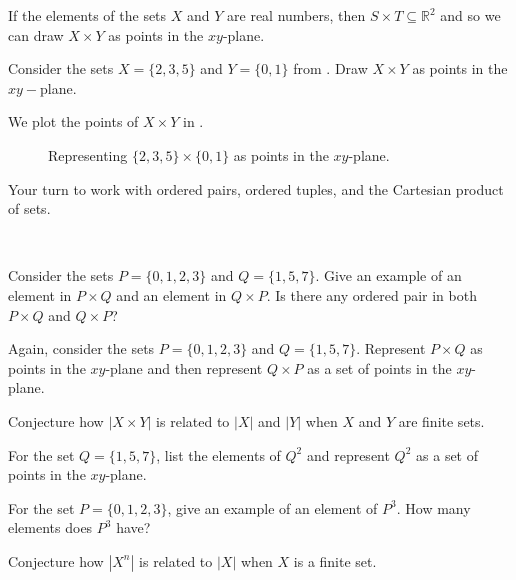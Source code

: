 If the elements of the sets $X$ and $Y$ are real numbers, then $S \times T \subseteq \mathbb{R}^2$ and so we can draw $X \times Y$ as points in the $xy$-plane.

\begin{exam}
    Consider the sets $X = \{2,3,5\}$ and $Y = \{0,1\}$ from .  Draw $X \times Y$ as points in the $xy-$plane.
        \begin{soln}
            We plot the points of $X \times Y$ in .

            \begin{figure}[hbtp]
                \centering
                
                \caption{Representing $\{2,3,5\} \times \{0,1\}$ as points in the $xy$-plane.}
                \label{fig_cart_prod_as_points}
            \end{figure}
        \end{soln}
\end{exam}

Your turn to work with ordered pairs, ordered tuples, and the Cartesian product of sets.

\begin{act}
\label{act_cart_prod}
~
    \begin{actpart}
        \item Consider the sets $P = \{0,1,2,3\}$ and $Q = \{1,5,7\}$. Give an example of an element in $P \times Q$ and an element in $Q \times P$.  Is there any ordered pair in both $P \times Q$ and $Q \times P$?
        \item Again, consider the sets $P = \{0,1,2,3\}$ and $Q = \{1,5,7\}$. Represent $P \times Q$ as points in the $xy$-plane and then represent $Q \times P$ as a set of points in the $xy$-plane.
        \item Conjecture how $|X \times Y|$ is related to $|X|$ and $|Y|$ when $X$ and $Y$ are finite sets.
        \item For the set $Q = \{1,5,7\}$, list the elements of $Q^2$ and represent $Q^2$ as a set of points in the $xy$-plane. 
        \item For the set $P = \{0,1,2,3\}$, give an example of an element of $P^3$.  How many elements does $P^3$ have?
        \item Conjecture how $|X^n|$ is related to $|X|$ when $X$ is a finite set.
    \end{actpart}
\end{act}

